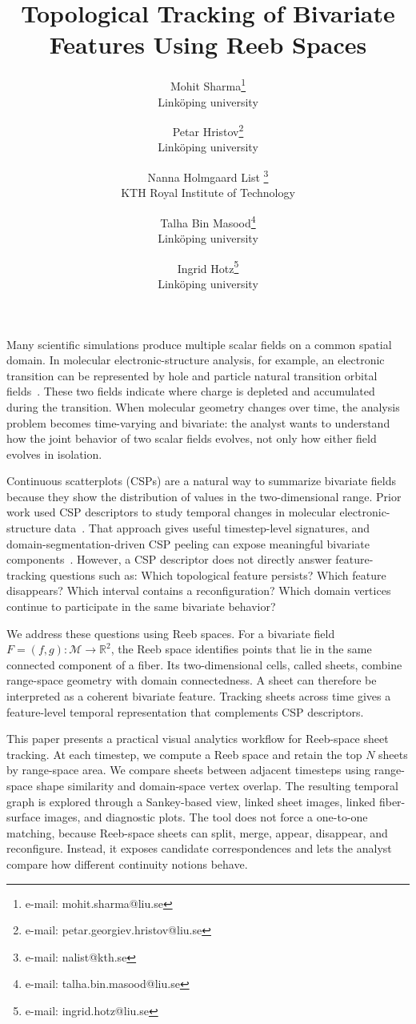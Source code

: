 \documentclass{vgtc}
\title{Topological Tracking of Bivariate Features Using Reeb Spaces}
\author{Mohit Sharma\thanks{e-mail: mohit.sharma@liu.se}\\ %
        \scriptsize Link\"oping university %
\and Petar Hristov\thanks{e-mail: petar.georgiev.hristov@liu.se}\\ %
        \scriptsize Link\"oping university %
\and Nanna Holmgaard List \thanks{e-mail: nalist@kth.se}\\ %
        \scriptsize KTH Royal Institute of Technology %
\and Talha Bin Masood\thanks{e-mail: talha.bin.masood@liu.se}\\ %
        \scriptsize Link\"oping university %
\and Ingrid Hotz\thanks{e-mail: ingrid.hotz@liu.se}\\ %
        \scriptsize Link\"oping university %
}
\newcommand{\R}{\mathbb{R}}
\newcommand{\Domain}{\mathcal{M}}
\begin{document}
\maketitle

Many scientific simulations produce multiple scalar fields on a common spatial domain. In molecular electronic-structure analysis, for example, an electronic transition can be represented by hole and particle natural transition orbital fields~\cite{Martin2003NTO}. These two fields indicate where charge is depleted and accumulated during the transition. When molecular geometry changes over time, the analysis problem becomes time-varying and bivariate: the analyst wants to understand how the joint behavior of two scalar fields evolves, not only how either field evolves in isolation.

Continuous scatterplots (CSPs) are a natural way to summarize bivariate fields because they show the distribution of values in the two-dimensional range. Prior work used CSP descriptors to study temporal changes in molecular electronic-structure data~\cite{Sharma2025}. That approach gives useful timestep-level signatures, and domain-segmentation-driven CSP peeling can expose meaningful bivariate components~\cite{Sharma2021}. However, a CSP descriptor does not directly answer feature-tracking questions such as: Which topological feature persists? Which feature disappears? Which interval contains a reconfiguration? Which domain vertices continue to participate in the same bivariate behavior?

We address these questions using Reeb spaces. For a bivariate field $F=(f,g):\Domain\rightarrow\R^2$, the Reeb space identifies points that lie in the same connected component of a fiber. Its two-dimensional cells, called sheets, combine range-space geometry with domain connectedness. A sheet can therefore be interpreted as a coherent bivariate feature. Tracking sheets across time gives a feature-level temporal representation that complements CSP descriptors.

This paper presents a practical visual analytics workflow for Reeb-space sheet tracking. At each timestep, we compute a Reeb space and retain the top $N$ sheets by range-space area. We compare sheets between adjacent timesteps using range-space shape similarity and domain-space vertex overlap. The resulting temporal graph is explored through a Sankey-based view, linked sheet images, linked fiber-surface images, and diagnostic plots. The tool does not force a one-to-one matching, because Reeb-space sheets can split, merge, appear, disappear, and reconfigure. Instead, it exposes candidate correspondences and lets the analyst compare how different continuity notions behave.
\end{document}
